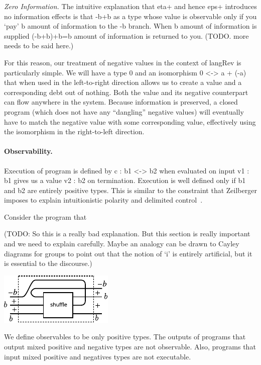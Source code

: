 \documentclass[preprint]{sigplanconf}
\begin{document}
\emph{Zero Information.}  The intuitive explanation that {{eta+}} and
hence {{eps+}} introduces no information effects is that {{-b+b}} as a
type whose value is observable only if you `pay' {{b}} amount of
information to the {{-b}} branch. When {{b}} amount of information is
supplied {{(-b+b)+b=b}} amount of information is returned to
you. (TODO. more needs to be said here.)

For this reason, our treatment of negative values in the context of
{{langRev}} is particularly simple. We will have a type $0$ and an
isomorphism {{0 <-> a + (-a)}} that when used in the left-to-right direction
allows us to create a value and a corresponding debt out of nothing. Both the
value and its negative counterpart can flow anywhere in the system. Because
information is preserved, a closed program (which does not have any
``dangling'' negative values) will eventually have to match the negative
value with some corresponding value, effectively using the isomorphism in the
right-to-left direction. 



\paragraph*{Observability.} 
Execution of program is defined by {{c : b1 <-> b2}} when evaluated on input
{{v1 : b1}} gives us a value {{v2 : b2}} on termination. Execution is well
defined only if {{b1}} and {{b2}} are entirely positive types. This is
similar to the constraint that Zeilberger imposes to explain intuitionistic
polarity and delimited control~\cite{10.1109/LICS.2010.23}.

Consider the program that

(TODO: So this is a really bad explanation. But this section is really
important and we need to explain carefully. Maybe an analogy can be
drawn to Cayley diagrams for groups to point out that the notion of
`i' is entirely artificial, but it is essential to the discourse.)

\begin{center}
  \includegraphics{diagrams/shuffle.pdf}
\end{center}

We define observables to be only positive types. The outputs of
programs that output mixed positive and negative types are not
observable.  Also, programs that input mixed positive and negatives
types are not executable.
\end{document}
